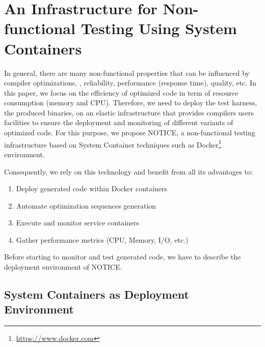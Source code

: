 \section{An Infrastructure for Non-functional Testing Using System Containers}

In general, there are many non-functional properties that can be influenced by compiler optimizations, \eg, reliability, performance (response time), quality, etc. In this paper, we focus on the efficiency of optimized code in term of resource consumption (memory and CPU).
Therefore, we need to deploy the test harness, \ie the produced binaries, on an elastic infrastructure that provides compilers users facilities to ensure the deployment and monitoring of different variants of optimized code. 
For this purpose, we propose NOTICE, a non-functional testing infrastructure based on System Container techniques such as Docker\footnote{\url{https://www.docker.com}} environment. 

Consequently, we rely on this technology and benefit from all its advantages to:
\begin{enumerate}
	\item Deploy generated code within Docker containers
	\item Automate optimization sequences generation
	\item Execute and monitor service containers
	\item Gather performance metrics (CPU, Memory, I/O, etc.)
\end{enumerate}


Before starting to monitor and test generated code, we have to describe the deployment environment of NOTICE.
\subsection{System Containers as Deployment Environment}


